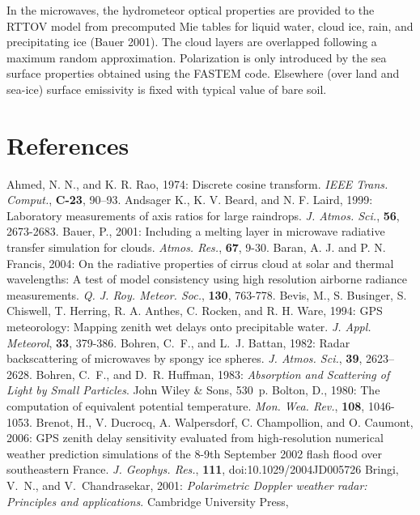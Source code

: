 In the microwaves, the hydrometeor optical properties are provided to the RTTOV
model from precomputed Mie tables for liquid water, cloud ice, rain, and
precipitating ice (Bauer 2001). The cloud layers are overlapped following
a maximum random approximation. Polarization is only introduced by the sea
surface properties obtained using the FASTEM code. Elsewhere (over land
and sea-ice) surface emissivity is fixed with typical value of bare soil.




\section{References}
\decrefname
Ahmed, N. N., and K. R. Rao, 1974: Discrete cosine transform. {\em IEEE Trans.
  Comput.}, {\bf C-23}, 90--93.
\decrefname
Andsager K., K. V. Beard, and N. F. Laird, 1999: 
      Laboratory measurements of axis ratios for large raindrops.
      {\it J. Atmos. Sci.},
      {\bf 56},
      2673-2683.
\decrefname
Bauer, P., 2001: Including a melting layer in microwave radiative transfer
       simulation for clouds. {\it Atmos. Res.}, {\bf 67}, 9-30.
\decrefname
Baran, A. J. and P. N. Francis, 2004:
      On the radiative properties of cirrus cloud at solar and thermal
      wavelengths: A test of model consistency using high resolution
      airborne radiance measurements.
      {\it Q. J. Roy. Meteor. Soc.}, {\bf 130}, 763-778.
\decrefname
Bevis, M., S. Businger, S. Chiswell, T. Herring, R. A. Anthes, C. Rocken, and R. H. Ware, 1994:
      GPS meteorology: Mapping zenith wet delays onto precipitable water.
      {\it J. Appl. Meteorol}, {\bf 33}, 379-386.
\decrefname
Bohren, C.~F., and L.~J. Battan, 1982: Radar backscattering of microwaves by
  spongy ice spheres. {\em J. Atmos. Sci.}, {\bf 39}, 2623--2628.
\decrefname
Bohren, C.~F., and D.~R. Huffman, 1983: {\em Absorption and Scattering of Light by
  Small Particles}. John Wiley \& Sons, 530~p.
\decrefname
Bolton, D., 1980: The computation of equivalent potential temperature.
      {\it Mon. Wea. Rev.}, 
      {\bf 108},
      1046-1053.
\decrefname
Brenot, H., V. Ducrocq, A. Walpersdorf, C. Champollion, and O. Caumont, 2006:
GPS zenith delay sensitivity evaluated from high-resolution numerical weather prediction
simulations of the 8-9th September 2002 flash flood over southeastern France.
      {\it J. Geophys. Res.},
      {\bf 111},
      doi:10.1029/2004JD005726
\decrefname
Bringi, V.~N., and V.~Chandrasekar, 2001: {\em Polarimetric {Doppler} weather
  radar\string: {Principles} and applications}. Cambridge University Press,
